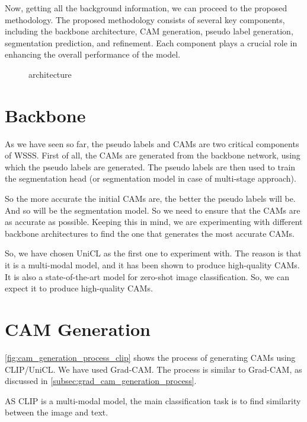 Now, getting all the background information, we can proceed to the proposed methodology. The proposed methodology consists of several key components, including the backbone architecture, CAM generation, pseudo label generation, segmentation prediction, and refinement. Each component plays a crucial role in enhancing the overall performance of the model.

\begin{figure}
    \centering
    \caption{architecture}
    \label{fig:architecture}
\end{figure}

\section{Backbone}
\label{sec:backbone}

As we have seen so far, the pseudo labels and CAMs are two critical components of WSSS. First of all, the CAMs are generated from the backbone network, using which the pseudo labels are generated. The pseudo labels are then used to train the segmentation head (or segmentation model in case of multi-stage approach).

So the more accurate the initial CAMs are, the better the pseudo labels will be. And so will be the segmentation model. So we need to ensure that the CAMs are as accurate as possible. Keeping this in mind, we are experimenting with different backbone architectures to find the one that generates the most accurate CAMs.

So, we have chosen UniCL as the first one to experiment with. The reason is that it is a multi-modal model, and it has been shown to produce high-quality CAMs. It is also a state-of-the-art model for zero-shot image classification. So, we can expect it to produce high-quality CAMs.

\section{CAM Generation}
\label{sec:cam_generation}

\autoref{fig:cam_generation_process_clip} shows the process of generating CAMs using CLIP/UniCL. We have used Grad-CAM. The process is similar to Grad-CAM, as discussed in \autoref{subsec:grad_cam_generation_process}.

AS CLIP is a multi-modal model, the main classification task is to find similarity between the image and text.

